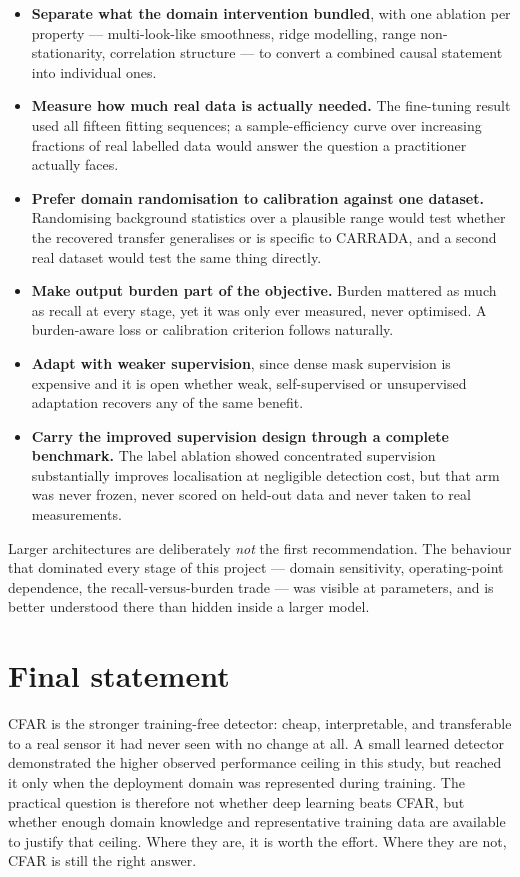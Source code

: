 \begin{itemize}
\itemsep2pt
\item \textbf{Separate what the domain intervention bundled}, with one ablation per property ---
multi-look-like smoothness, ridge modelling, range non-stationarity, correlation structure --- to
convert a combined causal statement into individual ones.
\item \textbf{Measure how much real data is actually needed.} The fine-tuning result used all
fifteen fitting sequences; a sample-efficiency curve over increasing fractions of real labelled data
would answer the question a practitioner actually faces.
\item \textbf{Prefer domain randomisation to calibration against one dataset.} Randomising background
statistics over a plausible range would test whether the recovered transfer generalises or is
specific to CARRADA, and a second real dataset would test the same thing directly.
\item \textbf{Make output burden part of the objective.} Burden mattered as much as recall at every
stage, yet it was only ever measured, never optimised. A burden-aware loss or calibration criterion
follows naturally.
\item \textbf{Adapt with weaker supervision}, since dense mask supervision is expensive and it is
open whether weak, self-supervised or unsupervised adaptation recovers any of the same benefit.
\item \textbf{Carry the improved supervision design through a complete benchmark.} The label
ablation showed concentrated supervision substantially improves localisation at negligible detection
cost, but that arm was never frozen, never scored on held-out data and never taken to real
measurements.
\end{itemize}

Larger architectures are deliberately \emph{not} the first recommendation. The behaviour that
dominated every stage of this project --- domain sensitivity, operating-point dependence, the
recall-versus-burden trade --- was visible at \TinyParams{} parameters, and is better understood there
than hidden inside a larger model.

\section*{Final statement}

CFAR is the stronger training-free detector: cheap, interpretable, and transferable to a real sensor
it had never seen with no change at all. A small learned detector demonstrated the higher observed
performance ceiling in this study, but reached it only when the deployment domain was represented
during training. The practical question is therefore not whether deep learning beats CFAR, but
whether enough domain knowledge and representative training data are available to justify that
ceiling. Where they are, it is worth the effort. Where they are not, CFAR is still the right answer.
